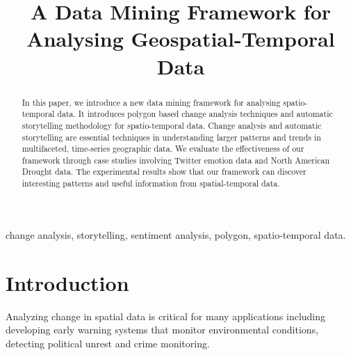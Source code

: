 \documentclass[conference]{IEEEtran}
\begin{document}
\title{A Data Mining Framework for Analysing Geospatial-Temporal Data}
\author{
\and
{}
}
\maketitle

\begin{abstract}
In this paper, we introduce a new data mining framework for analysing spatio-temporal data. It introduces polygon based change analysis techniques and automatic storytelling methodology for spatio-temporal data. Change analysis and automatic storytelling are essential techniques in understanding larger patterns and trends in multifaceted, time-series geographic data. We evaluate the effectiveness of our framework through case studies involving Twitter emotion  data and North American Drought data. The experimental results show that our framework can discover interesting patterns and useful information from spatial-temporal data.
\end{abstract}

\begin{IEEEkeywords}
change analysis, storytelling, sentiment analysis, polygon, spatio-temporal data.
\end{IEEEkeywords}


\section{Introduction}
Analyzing change in spatial data is critical for many applications including developing early warning systems that monitor environmental conditions, detecting political unrest and crime monitoring.
 
\end{document}
